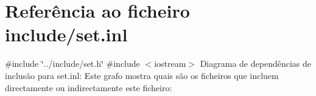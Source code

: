 \hypertarget{set_8inl}{}\section{Referência ao ficheiro include/set.inl}
\label{set_8inl}
{\ttfamily \#include \char`\"{}../include/set.\+h\char`\"{}}\newline
{\ttfamily \#include $<$iostream$>$}\newline
Diagrama de dependências de inclusão para set.\+inl\+:
Este grafo mostra quais são os ficheiros que incluem directamente ou indirectamente este ficheiro\+:
